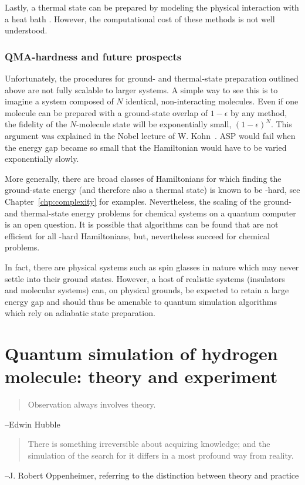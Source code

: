 \documentclass[11pt,oneside,final]{huthesis}%
\begin{document}
Lastly, a thermal state can be prepared by modeling the physical interaction
with a heat bath \cite{Zalka98,Terhal00}. However, the computational cost of
these methods is not well understood.



\subsection{QMA-hardness and future prospects}

Unfortunately, the procedures for ground- and thermal-state preparation outlined
above are not fully scalable to larger systems. A simple way to see this is to
imagine a system composed of $N$ identical, non-interacting molecules. Even if
one molecule can be prepared with a ground-state overlap of $1-\epsilon$ by any
method, the fidelity of the $N$-molecule state will be exponentially small, 
$(1-\epsilon)^N $.  This argument was explained in the Nobel lecture of W. Kohn~\cite{Kohn99}. ASP would fail when the energy gap became so
small that the Hamiltonian would have to be varied exponentially slowly.

More generally, there are broad classes of Hamiltonians for which finding the
ground-state energy (and therefore also a thermal state) is known to be {\qma}-hard, see Chapter~\ref{chp:complexity} for examples. 
Nevertheless, the scaling of the ground- and
thermal-state energy problems for chemical systems on a quantum computer is an
open question. It is possible that algorithms can be found that are not
efficient for all {\qma}-hard Hamiltonians, but, nevertheless succeed for
chemical problems.

In fact, there are physical systems such as spin glasses
in nature which may never settle into their ground states.
However, a host of realistic systems (\eg insulators and molecular systems) can, on
physical grounds, be expected to retain a large energy gap and should thus be
amenable to quantum simulation algorithms which rely on adiabatic
state preparation.  

\chapter{Quantum simulation of hydrogen molecule: theory and experiment}\label{chp:h2}
\begin{quote}
Observation always involves theory.
\end{quote}
--Edwin Hubble\\[1ex]
\begin{quote}
There is something irreversible about acquiring knowledge; and the simulation of the search for it differs in a most profound way from reality.
\end{quote}
--J. Robert Oppenheimer, referring to the distinction between theory and practice\\[2ex]
\end{document}

